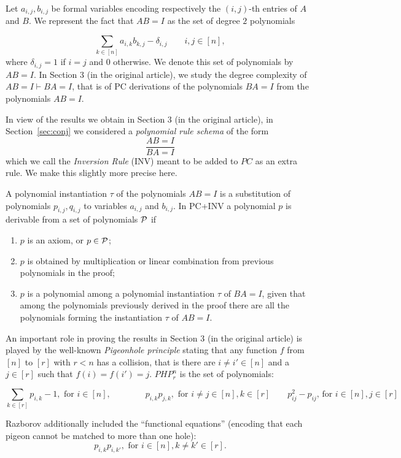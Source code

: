 \documentclass[10pt,a4paper]{article}
\theoremstyle{definition}
\begin{document}
Let $a_{i,j},b_{i,j}$ be formal variables 
 encoding respectively  the $(i,j)$-th entries of $A$ and $B$.  We represent the fact that $AB=I$ as the set of degree $2$ polynomials

$$
\sum_{k \in [n]} a_{i,k}b_{k,j} - \delta_{i,j}\qquad i,j \in [n],
$$
where $\delta_{i,j}=1$ if $i=j$ and $0$ otherwise. We denote this set of polynomials by $AB=I$. In Section 3 (in the original article), we study the degree complexity of  $AB=I \vdash BA=I$, that is of PC derivations of the polynomials $BA=I$ from the polynomials $AB=I$. 

\medskip

In view of the results we obtain in Section 3 (in the original article), in Section~\ref{sec:conj} we considered a  {\em polynomial rule schema} of the form 
$$
\frac{AB=I}{BA=I}
$$
which we call the {\em Inversion Rule} (INV) meant to be added to $PC$ as an extra rule. We make this slightly more precise here.

A polynomial instantiation $\tau$ of the polynomials $AB=I$ is a substitution of polynomials $p_{i,j},q_{i,j}$ to variables $a_{i,j}$ and $b_{i,j}$.   
In PC+INV a polynomial $p$ is derivable from a set of polynomials
${\cal P}$ if 
\begin{enumerate}
\item $p$ is an axiom, or $p \in {\cal P}$;
\item $p$ is obtained by multiplication or linear combination from previous polynomials in the proof;
\item $p$ is a polynomial among a polynomial instantiation $\tau$ of $BA=I$, given that among the polynomials previously derived  in the proof there are all the polynomials 
forming the instantiation $\tau$ of $AB=I$.
\end{enumerate}

\medskip

 An important role in proving the results in Section 3 (in the original article) is played by the well-known {\em Pigeonhole principle} stating that  any function $f$ from $[n]$ to $[r]$ with $r<n$ has a collision, that is there are $i \not= i' \in [n]$ and a $j\in[r]$ such that $f(i)=f(i')=j$. $PHP^n_r$ is the set of polynomials:

$$
\sum_{k\in [r]}p_{i,k} -1, \mbox{ for } i \in [n], \qquad \qquad p_{i,k}p_{j,k}, \mbox{ for } i \not= j \in [n], k \in [r] \qquad p_{ij}^2 - p_{ij} \text{, for $i \in [n], j \in [r]$} 
$$

Razborov \cite{DBLP:journals/cc/Razborov98} additionally included the ``functional equations'' (encoding that each pigeon cannot be matched to more than one hole):
\[
p_{i,k} p_{i,k'}, \mbox{ for } i \in [n], k \neq k' \in [r].
\]
\end{document}
